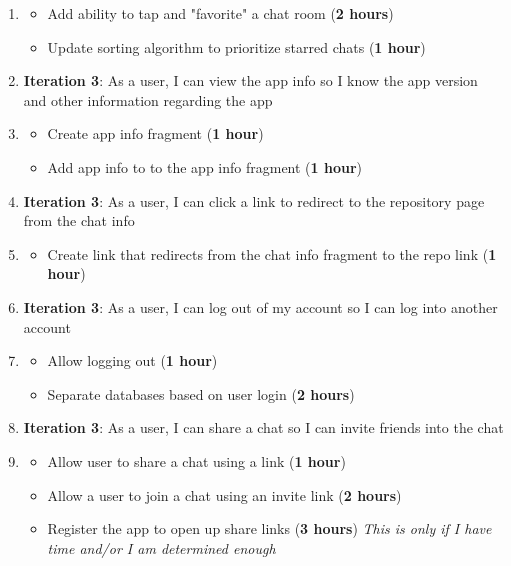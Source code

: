 \documentclass{report}
\begin{document}
\begin{enumerate}
    \item[] \begin{itemize}
    \item Add ability to tap and "favorite" a chat room (\textbf{2 hours})
        \item Update sorting algorithm to prioritize starred chats (\textbf{1 hour})
    \end{itemize}
    \item \textbf{Iteration 3}: As a user, I can view the app info so I know the app version and other information regarding the app
    \item[] \begin{itemize}
        \item Create app info fragment (\textbf{1 hour})
        \item Add app info to to the app info fragment (\textbf{1 hour})
    \end{itemize}
    \item \textbf{Iteration 3}: As a user, I can click a link to redirect to the repository page from the chat info
    \item[] \begin{itemize}
        \item Create link that redirects from the chat info fragment to the repo link (\textbf{1 hour})
    \end{itemize}
    \item \textbf{Iteration 3}: As a user, I can log out of my account so I can log into another account
    \item[]\begin{itemize}
        \item Allow logging out (\textbf{1 hour})
        \item Separate databases based on user login (\textbf{2 hours})
    \end{itemize}
    \item \textbf{Iteration 3}: As a user, I can share a chat so I can invite friends into the chat
    \item[] \begin{itemize}
        \item Allow user to share a chat using a link (\textbf{1 hour})
        \item Allow a user to join a chat using an invite link (\textbf{2 hours})
        \item Register the app to open up share links (\textbf{3 hours}) \textit{This is only if I have time and/or I am determined enough}
    \end{itemize}
\end{enumerate}
\end{document}
